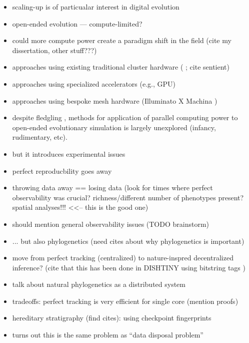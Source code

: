 \begin{itemize}
  \item scaling-up is of particualar interest in digital evolution
  \item open-ended evolution --- compute-limited? \citep{channon2019maximum, taylor2016open}
  \item could more compute power create a paradigm shift in the field (cite my dissertation, other stuff???)
  \item approaches using existing traditional cluster hardware ( \citep{moreno2021conduit}; cite sentient)
  \item approaches using specialized accelerators (e.g., GPU)
  \item approaches using bespoke mesh hardware (Illuminato X Machina \citep{schulte2010genetic})
  \item despite fledgling , methods for application of parallel computing power to open-ended evolutionary simulation is largely unexplored (infancy, rudimentary, etc).
\end{itemize}

\begin{itemize}
  \item but it introduces experimental issues
  \item perfect reproducbility goes away
  \item throwing data away == losing data (look for times where perfect observability was crucial? richness/different number of phenotypes present? spatial analyses!!! <<-- this is the good one)
  \item should mention general observability issues (TODO brainstorm)
  \item ... but also phylogenetics (need cites about why phylogenetics is important)
  \item move from perfect tracking (centralized) to nature-inspred decentralized inference? (cite that this has been done in DISHTINY using bitstring tags \citep{moreno2021case})
  \item talk about natural phylogenetics as a distributed system
  \item tradeoffs: perfect tracking is very efficient for single core (mention proofs)
  \item hereditary stratigraphy (find cites): using checkpoint fingerprints
  \item turns out this is the same problem as ``data disposal problem''
\end{itemize}


